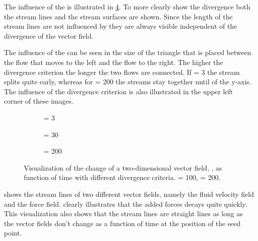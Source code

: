 The influence of the \divergenceCriterion is illustrated in \cref{fig:streamsurfaces:differentDivergenceCriterion}. To more clearly show the divergence both the stream lines and the stream surfaces are shown. Since the length of the stream lines are not influenced by \divergenceCriterion they are always visible independent of the divergence of the vector field.

The influence of the \divergenceCriterion can be seen in the size of the triangle that is placed between the flow that moves to the left and the flow to the right. The higher the divergence criterion the longer the two flows are connected. If \divergenceCriterion = 3 the stream splits quite early, whereas for \divergenceCriterion = 200 the streams stay together until  of the y-axis. The influence of the divergence criterion is also illustrated in the upper left corner of these images. 

\begin{figure}
	\centering
	\begin{subfigure}[b]{0.3\textwidth}
		\centering
		\caption{\resolution = 3}
		\label{fig:streamsurfaces:differentDivergenceCriterion:r3}
	\end{subfigure}
	\begin{subfigure}[b]{0.3\textwidth}
		\centering
		\caption{\resolution = 30}
		\label{fig:streamsurfaces:differentDivergenceCriterion:r30}
	\end{subfigure} 
	\begin{subfigure}[b]{0.3\textwidth}
		\centering
		\caption{\resolution = 200}
		\label{fig:streamsurfaces:differentDivergenceCriterion:r200}
	\end{subfigure} 
	\caption{Visualization of the change of a two-dimensional vector field, \velocity, as function of time with different divergence criteria. %
	\resolution = 100, \numStates = 200.}
	\label{fig:streamsurfaces:differentDivergenceCriterion}
\end{figure}

 shows the stream lines of two different vector fields, namely the fluid velocity field and the force field.  clearly illustrates that the added forces decays quite quickly. This visualization also shows that the stream lines are straight lines as long as the vector fields don't change as a function of time at the position of the seed point.

